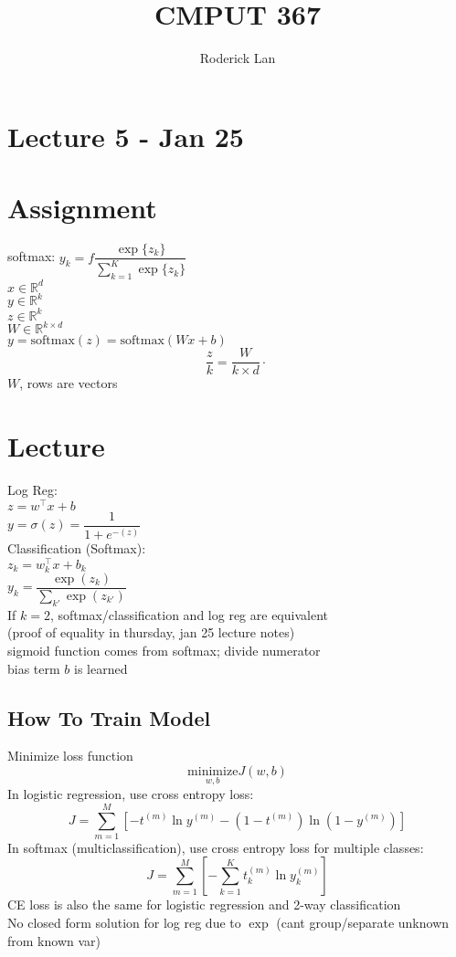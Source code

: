 \documentclass{article}
\title{CMPUT 367}
\author{Roderick Lan}
\date{}
\begin{document}
\maketitle

\tableofcontents
\break

\section*{Lecture 5 - Jan 25}


\section{Assignment}
softmax: $y_k = f\dfrac{\exp \{z_k\}}{\sum_{k=1}^{K} \exp \{z_k \}}$
\\[10pt]
$x\in\mathbb R^d$\\
$y\in\mathbb R^k$\\
$z\in\mathbb R^k$\\
$W\in\mathbb R^{k\times d}$\\
$y = \mathrm{softmax}(z) = \mathrm{softmax}(Wx + b)$
\[
    \frac{z}{k} = \frac{W}{k\times d} \cdot \frac{}{}
\]
$W$, rows are vectors

\section{Lecture}
Log Reg:\\
$z= w^\top x + b$ 
\\
$y = \sigma (z) = \dfrac{1}{1+e^{-(z)}}$
\\[5pt]
Classification (Softmax):\\
$z_k =w^\top _k x + b_k$\\
$y_k = \dfrac{\exp (z_k)}{\sum_{k'}^{}\exp(z_{k'})}$
\\[5pt]
If $k=2$, softmax/classification and log reg are equivalent
\\
(proof of equality in thursday, jan 25 lecture notes)
\\
sigmoid function comes from softmax; divide numerator
\\
bias term $b$ is learned 


\subsection{How To Train Model}
Minimize loss function
\[
    \underset{w,b}{\mathrm{minimize}} J(w,b)
\]
In logistic regression, use cross entropy loss:
\[
    J = \sum_{m=1}^{M} \left [
        -t^{(m)} \ln y^{(m)} - (1-t^{(m)}) \ln (1-y^{(m)})
    \right ]
\]
In softmax (multiclassification), use cross entropy loss for multiple classes:
\[
    J = \sum_{m=1}^{M} \left [
        -\sum_{k=1}^{K} t_k^{(m)} \ln y_k ^{(m)}
    \right ]
\]
\noindent
CE loss is also the same for logistic regression and 2-way classification
\\
No closed form solution for log reg due to $\exp$ (cant group/separate unknown from known var)
\end{document}
